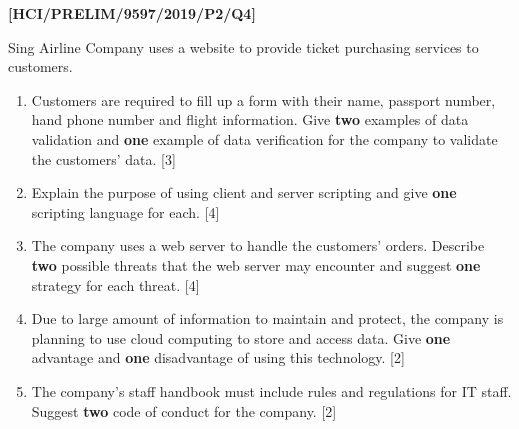 \item \textbf{{[}HCI/PRELIM/9597/2019/P2/Q4{]} }

Sing Airline Company uses a website to provide ticket purchasing services
to customers. 
\begin{enumerate}
\item Customers are required to fill up a form with their name, passport
number, hand phone number and flight information. Give \textbf{two}
examples of data validation and \textbf{one} example of data verification
for the company to validate the customers\textquoteright{} data. \hfill{}
{[}3{]}
\item Explain the purpose of using client and server scripting and give
\textbf{one} scripting language for each. \hfill{} {[}4{]}
\item The company uses a web server to handle the customers\textquoteright{}
orders. Describe \textbf{two} possible threats that the web server
may encounter and suggest \textbf{one} strategy for each threat. \hfill{}
{[}4{]}
\item Due to large amount of information to maintain and protect, the company
is planning to use cloud computing to store and access data. Give
\textbf{one} advantage and \textbf{one} disadvantage of using this
technology. \hfill{}{[}2{]}
\item The company\textquoteright s staff handbook must include rules and
regulations for IT staff. Suggest \textbf{two} code of conduct for
the company. \hfill{} {[}2{]}
\end{enumerate}